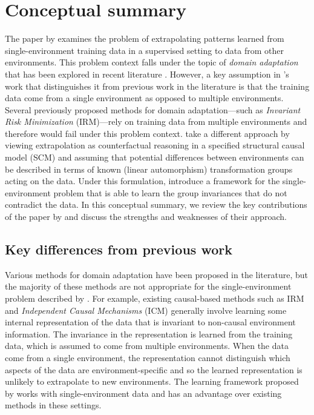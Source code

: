 

\section{Conceptual summary}

The paper by \textcite{Mouli:2021} examines the problem of extrapolating patterns learned from single-environment training data in a supervised setting to data from other environments. This problem context falls under the topic of \textit{domain adaptation} that has been explored in recent literature \parencite{Farahani:2020}. However, a key assumption in \citeauthor{Mouli:2021}'s work that distinguishes it from previous work in the literature is that the training data come from a single environment as opposed to multiple environments. Several previously proposed methods for domain adaptation---such as \textit{Invariant Risk Minimization} \parencite{Arjovsky:2020} (IRM)---rely on training data from multiple environments and therefore would fail under this problem context. \citeauthor{Mouli:2021} take a different approach by viewing extrapolation as counterfactual reasoning in a specified structural causal model (SCM) and assuming that potential differences between environments can be described in terms of known (linear automorphism) transformation groups acting on the data. Under this formulation, \citeauthor{Mouli:2021} introduce a framework for the single-environment problem that is able to learn the group invariances that do not contradict the data. In this conceptual summary, we review the key contributions of the paper by \textcite{Mouli:2021} and discuss the strengths and weaknesses of their approach.


\subsection{Key differences from previous work}

Various methods for domain adaptation have been proposed in the literature, but the majority of these methods are not appropriate for the single-environment problem described by \textcite{Mouli:2021}. For example, existing causal-based methods such as IRM and \textit{Independent Causal Mechanisms} \parencite{Parascandolo:2018} (ICM) generally involve learning some internal representation of the data that is invariant to non-causal environment information. The invariance in the representation is learned from the training data, which is assumed to come from multiple environments. When the data come from a single environment, the representation cannot distinguish which aspects of the data are environment-specific and so the learned representation is unlikely to extrapolate to new environments. The learning framework proposed by \citeauthor{Mouli:2021} works with single-environment data and has an advantage over existing methods in these settings.
\\

